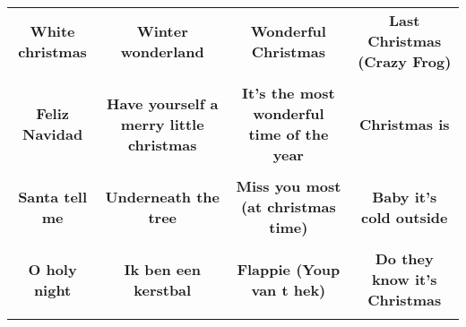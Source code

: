 \documentclass[12pt]{article} \usepackage{eso-pic, graphicx}
\newcommand{\background}[1]{%
\AddToShipoutPictureBG*{\texttt{[image: \#1]}}
}
\begin{document}
\tabcolsep=30.2pt \renewcommand{\arraystretch}{4.5}   \vspace*{4.3cm} \begin{center}  \begin{tabular}{c c c c}
\parbox{3cm}{\centering \textbf{White christmas}}& 
\parbox{3cm}{\centering \textbf{Winter wonderland}}& 
\parbox{3cm}{\centering \textbf{Wonderful Christmas}}& 
\parbox{3cm}{\centering \textbf{Last Christmas (Crazy Frog)}}\\ \\ 
\parbox{3cm}{\centering \textbf{Feliz Navidad}}& 
\parbox{3cm}{\centering \textbf{Have yourself a merry little christmas}}& 
\parbox{3cm}{\centering \textbf{It’s the most wonderful time of the year}}& 
\parbox{3cm}{\centering \textbf{Christmas is}}\\ \\ 
\parbox{3cm}{\centering \textbf{Santa tell me}}& 
\parbox{3cm}{\centering \textbf{Underneath the tree}}& 
\parbox{3cm}{\centering \textbf{Miss you most (at christmas time)}}& 
\parbox{3cm}{\centering \textbf{Baby it’s cold outside}}\\ \\ 
\parbox{3cm}{\centering \textbf{O holy night}}& 
\parbox{3cm}{\centering \textbf{Ik ben een kerstbal}}& 
\parbox{3cm}{\centering \textbf{Flappie (Youp van t hek)}}& 
\parbox{3cm}{\centering \textbf{Do they know it's Christmas}}\\ \\ 
\end{tabular} \background{discobingo.pdf} \end{center} 
\end{document}
